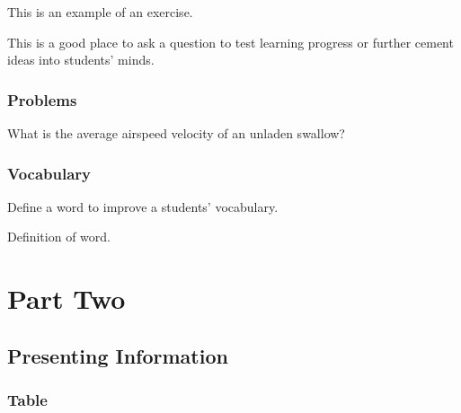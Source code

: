 This is an example of an exercise.

\begin{exercise}
	This is a good place to ask a question to test learning progress or further cement ideas into students' minds.
\end{exercise}


\section{Problems}

\begin{problem}
	What is the average airspeed velocity of an unladen swallow?
\end{problem}


\section{Vocabulary}

Define a word to improve a students' vocabulary.

\begin{vocabulary}[Word]
	Definition of word.
\end{vocabulary}


\part{Part Two}



\chapter{Presenting Information}

\section{Table}

